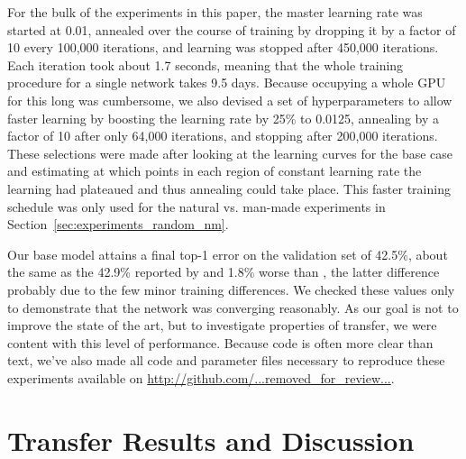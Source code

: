 
For the bulk of the experiments in this paper, the master learning rate was started at 0.01, annealed over the course of training by dropping it by a factor of 10 every 100,000 iterations, and learning was stopped after 450,000 iterations.
Each iteration took about 1.7 seconds, meaning that the whole training procedure for a single network takes 9.5 days.
Because occupying a whole GPU for this long was cumbersome, we also devised a set of hyperparameters to allow faster learning by boosting the learning rate by 25\% to 0.0125, annealing by a factor of 10 after only 64,000 iterations, and stopping after 200,000 iterations. These selections were made after looking at the learning curves for the base case and estimating at which points in each region of constant learning rate the learning had plateaued and thus annealing could take place.
This faster training schedule was only used for the natural vs. man-made experiments in Section~\ref{sec:experiments_random_nm}.



%

Our base model attains a final top-1 error on the validation set of 42.5\%, about the same as the 42.9\% reported by \cite{donahue+jia-2013-arxiv} and 1.8\% worse than \cite{Krizhevsky-2012}, the latter difference probably due to the few minor training differences. We checked these values only to demonstrate that the network was converging reasonably. As our goal is not to improve the state of the art, but to investigate properties of transfer, we were content with this level of performance. Because code is often more clear than text, we've also made all code and parameter files necessary to reproduce these experiments available on \url{http://github.com/...removed_for_review...}.






\section{Transfer Results and Discussion}
\label{sec:experiments}

